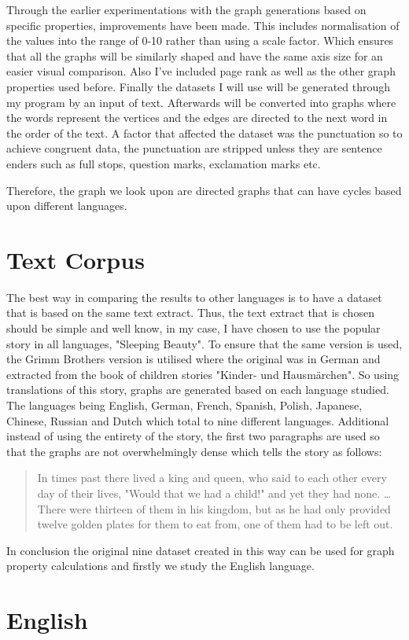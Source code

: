 Through the earlier experimentations with the graph generations based on specific properties, improvements have been made. This includes normalisation of the values into the range of 0-10 rather than using a scale factor. Which ensures that all the graphs will be similarly shaped and have the same axis size for an easier visual comparison. Also I've included page rank as well as the other graph properties used before. Finally the datasets I will use will be generated through my program by an input of text. Afterwards will be converted into graphs where the words represent the vertices and the edges are directed to the next word in the order of the text. A factor that affected the dataset was the punctuation so to achieve congruent data, the punctuation are stripped unless they are sentence enders such as full stops, question marks, exclamation marks etc. 

Therefore, the graph we look upon are directed graphs that can have cycles based upon different languages.

\section{Text Corpus}
The best way in comparing the results to other languages is to have a dataset that is based on the same text extract. Thus, the text extract that is chosen should be simple and well know, in my case, I have chosen to use the popular story in all languages, "Sleeping Beauty". To ensure that the same version is used, the Grimm Brothers version is utilised where the original was in German and extracted from the book of children stories "Kinder- und Hausmärchen"\cite{grimm1857kinder}. So using translations of this story, graphs are generated based on each language studied. The languages being English, German, French, Spanish, Polish, Japanese, Chinese, Russian and Dutch which total to nine different languages. Additional instead of using the entirety of the story, the first two paragraphs are used so that the graphs are not overwhelmingly dense which tells the story as follows:
\begin{quote}
In times past there lived a king and queen, who said to each other every day of their lives, "Would that we had a child!" and yet they had none. \dots There were thirteen of them in his kingdom, but as he had only provided twelve golden plates for them to eat from, one of them had to be left out.
\end{quote}
In conclusion the original nine dataset created in this way can be used for graph property calculations and firstly we study the English language.

\section{English}
